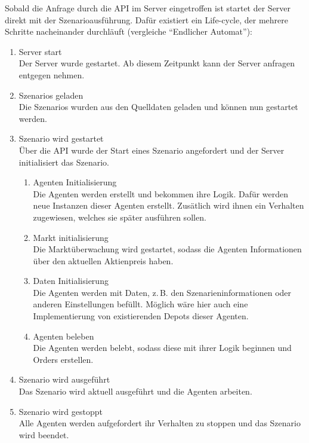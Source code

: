 Sobald die Anfrage durch die \ac{API} im Server eingetroffen ist startet der Server direkt mit der Szenarioausführung. Dafür existiert ein Life-cycle, der mehrere Schritte nacheinander durchläuft (vergleiche \enquote{Endlicher Automat}):

\begin{enumerate}
    \item Server start\\
        Der Server wurde gestartet. Ab diesem Zeitpunkt kann der Server anfragen entgegen nehmen.
    \item Szenarios geladen\\
        Die Szenarios wurden aus den Quelldaten geladen und können nun gestartet werden.
    \item Szenario wird gestartet\\
        Über die \ac{API} wurde der Start eines Szenario angefordert und der Server initialisiert das Szenario.
        \begin{enumerate}
            \item Agenten Initialisierung\\
                Die Agenten werden erstellt und bekommen ihre Logik. Dafür werden neue Instanzen dieser Agenten erstellt. Zusätlich wird ihnen ein Verhalten zugewiesen, welches sie später ausführen sollen.
            \item Markt initialisierung\\
                Die Marktüberwachung wird gestartet, sodass die Agenten Informationen über den aktuellen Aktienpreis haben.
            \item Daten Initialisierung\\
                Die Agenten werden mit Daten, z.\,B. den Szenarieninformationen oder anderen Einstellungen befüllt.
                Möglich wäre hier auch eine Implementierung von existierenden Depots dieser Agenten.
            \item Agenten beleben\\
                Die Agenten werden belebt, sodass diese mit ihrer Logik beginnen und Orders erstellen.
        \end{enumerate}
    \item Szenario wird ausgeführt\\
        Das Szenario wird aktuell ausgeführt und die Agenten arbeiten.
    \item Szenario wird gestoppt\\
        Alle Agenten werden aufgefordert ihr Verhalten zu stoppen und das Szenario wird beendet.
\end{enumerate}


